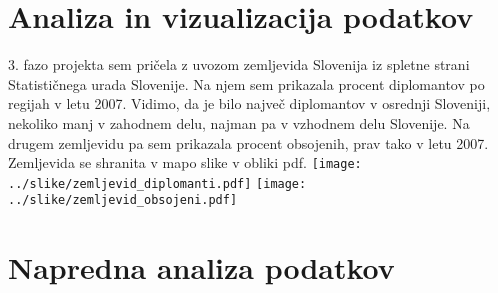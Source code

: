 \documentclass[11pt,a4paper]{article}
\begin{document}
\section{Analiza in vizualizacija podatkov}
3. fazo projekta sem pričela z uvozom zemljevida Slovenija iz spletne strani Statističnega urada Slovenije. Na njem sem prikazala procent diplomantov po regijah v letu 2007. Vidimo, da je bilo največ diplomantov v osrednji Sloveniji, nekoliko manj v zahodnem delu, najman pa v vzhodnem delu Slovenije.
Na drugem zemljevidu pa sem prikazala procent obsojenih, prav tako v letu 2007.
Zemljevida se shranita v mapo slike v obliki pdf.
\newline
\newline
\newline
\texttt{[image: ../slike/zemljevid\_diplomanti.pdf]}
\texttt{[image: ../slike/zemljevid\_obsojeni.pdf]}


\section{Napredna analiza podatkov}

\end{document}
